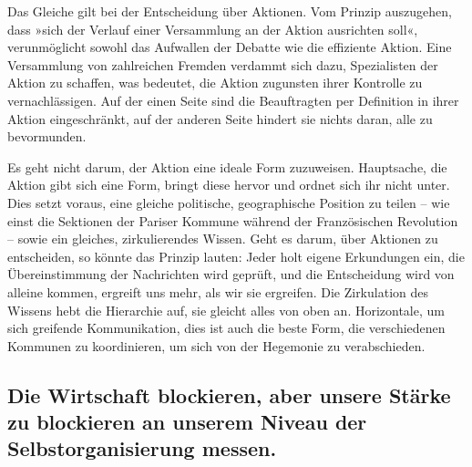 \extrapar{}

Das Gleiche gilt bei der Entscheidung über Aktionen. Vom Prinzip
auszugehen, dass »sich der Verlauf einer Versammlung an der Aktion
ausrichten soll«, verunmöglicht sowohl das Aufwallen der Debatte
wie die effiziente Aktion. Eine Versammlung von zahlreichen Fremden
verdammt sich dazu, Spezialisten der Aktion zu schaffen, was
bedeutet, die Aktion zugunsten ihrer Kontrolle zu vernachlässigen.
Auf der einen Seite sind die Beauftragten per Definition in ihrer
Aktion eingeschränkt, auf der anderen Seite hindert sie nichts
daran, alle zu bevormunden.
\extrapar{}

Es geht nicht darum, der Aktion eine ideale Form zuzuweisen.
Hauptsache, die Aktion gibt sich eine Form, bringt diese hervor und
ordnet sich ihr nicht unter. Dies setzt voraus, eine gleiche
politische, geographische Position zu teilen – wie einst die
Sektionen der Pariser Kommune während der Französischen Revolution
– sowie ein gleiches, zirkulierendes Wissen. Geht es darum, über
Aktionen zu entscheiden, so könnte das Prinzip lauten: Jeder holt
eigene Erkundungen ein, die Übereinstimmung der Nachrichten wird
geprüft, und die Entscheidung wird von alleine kommen, ergreift uns
mehr, als wir sie ergreifen. Die Zirkulation des Wissens hebt die
Hierarchie auf, sie gleicht alles von oben an. Horizontale, um sich
greifende Kommunikation, dies ist auch die beste Form, die
verschiedenen Kommunen zu koordinieren, um sich von der Hegemonie
zu verabschieden.

\subsection{Die Wirtschaft blockieren, aber unsere Stärke zu 
blockieren an unserem Niveau der Selbstorganisierung messen.}

